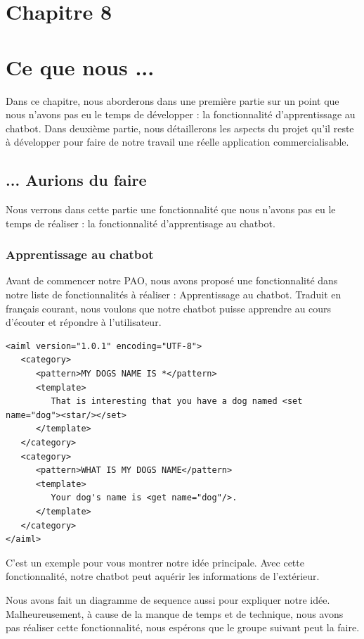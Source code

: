 \section*{Chapitre 8}
\section{Ce que nous ...}
\indent Dans ce chapitre, nous aborderons dans une première partie sur un point que nous n'avons pas eu le temps de développer :  la fonctionnalité d’apprentissage au chatbot. Dans deuxième partie, nous détaillerons les aspects du projet qu'il reste à développer pour faire de notre travail une réelle application commercialisable.

\subsection{... Aurions du faire}
\indent Nous verrons dans cette partie une fonctionnalité que nous n'avons pas eu le temps de réaliser : la fonctionnalité d'apprentisage au chatbot.

\subsubsection{Apprentissage au chatbot}
\indent Avant de commencer notre PAO, nous avons proposé une fonctionnalité dans notre liste de fonctionnalités à réaliser : Apprentissage au chatbot. Traduit en français courant, nous voulons que notre chatbot puisse apprendre au cours d'écouter et répondre à l'utilisateur. 

\begin{lstlisting}[frame=none,aboveskip=0.5em]
<aiml version="1.0.1" encoding="UTF-8">
   <category>
      <pattern>MY DOGS NAME IS *</pattern>
      <template>
         That is interesting that you have a dog named <set name="dog"><star/></set>
      </template>  
   </category>  
   <category>
      <pattern>WHAT IS MY DOGS NAME</pattern>
      <template>
         Your dog's name is <get name="dog"/>.
      </template>  
   </category>  
</aiml>
\end{lstlisting}

\indent C'est un exemple pour vous montrer notre idée principale. Avec cette fonctionnalité, notre chatbot peut aquérir les informations de l'extérieur.

\indent Nous avons fait un diagramme de sequence aussi pour expliquer notre idée. Malheureusement, à cause de la manque de temps et de technique, nous avons pas réaliser cette fonctionnalité, nous espérons que le groupe suivant peut la faire. 


